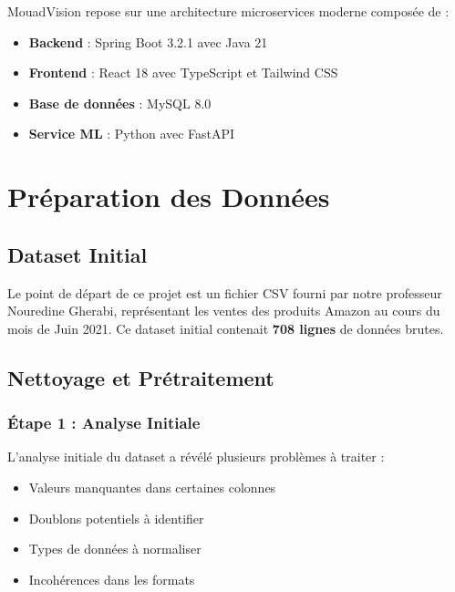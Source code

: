 \documentclass[12pt,a4paper]{report}
\begin{document}
MouadVision repose sur une architecture microservices moderne composée de :

\begin{itemize}[noitemsep]
    \item \textbf{Backend} : Spring Boot 3.2.1 avec Java 21
    \item \textbf{Frontend} : React 18 avec TypeScript et Tailwind CSS
    \item \textbf{Base de données} : MySQL 8.0
    \item \textbf{Service ML} : Python avec FastAPI
\end{itemize}

\chapter{Préparation des Données}

\section{Dataset Initial}

Le point de départ de ce projet est un fichier CSV fourni par notre professeur Nouredine Gherabi, représentant les ventes des produits Amazon au cours du mois de Juin 2021. Ce dataset initial contenait \textbf{708 lignes} de données brutes.

\section{Nettoyage et Prétraitement}

\subsection{Étape 1 : Analyse Initiale}

L'analyse initiale du dataset a révélé plusieurs problèmes à traiter :

\begin{itemize}[noitemsep]
    \item Valeurs manquantes dans certaines colonnes
    \item Doublons potentiels à identifier
    \item Types de données à normaliser
    \item Incohérences dans les formats
\end{itemize}
\end{document}
